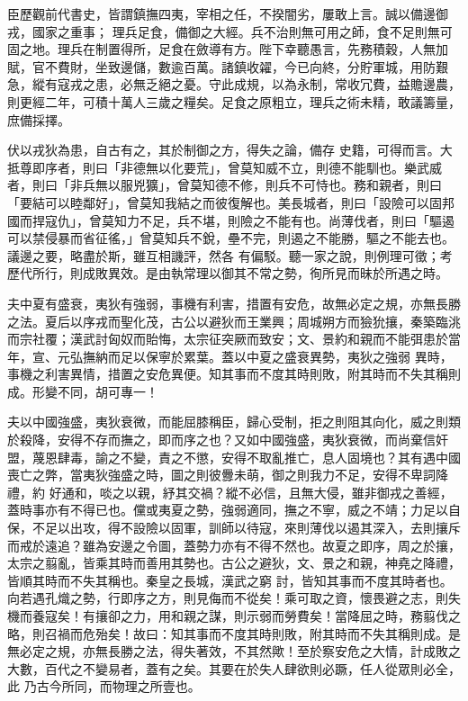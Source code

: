 \begin{pinyinscope}
 臣歷觀前代書史，皆謂鎮撫四夷，宰相之任，不揆闇劣，屢敢上言。誠以備邊御戎，國家之重事；
 理兵足食，備御之大經。兵不治則無可用之師，食不足則無可固之地。理兵在制置得所，足食在斂導有方。陛下幸聽愚言，先務積穀，人無加賦，官不費財，坐致邊儲，數逾百萬。諸鎮收糴，今已向終，分貯軍城，用防艱急，縱有寇戎之患，必無乏絕之憂。守此成規，以為永制，常收冗費，益贍邊農，則更經二年，可積十萬人三歲之糧矣。足食之原粗立，理兵之術未精，敢議籌量，庶備採擇。



 伏以戎狄為患，自古有之，其於制御之方，得失之論，備存
 史籍，可得而言。大抵尊即序者，則曰「非德無以化要荒」，曾莫知威不立，則德不能馴也。樂武威者，則曰「非兵無以服兇獷」，曾莫知德不修，則兵不可恃也。務和親者，則曰「要結可以睦鄰好」，曾莫知我結之而彼復解也。美長城者，則曰「設險可以固邦國而捍寇仇」，曾莫知力不足，兵不堪，則險之不能有也。尚薄伐者，則曰「驅遏可以禁侵暴而省征徭，」曾莫知兵不銳，壘不完，則遏之不能勝，驅之不能去也。議邊之要，略盡於斯，雖互相譏評，然各
 有偏駁。聽一家之說，則例理可徵；考歷代所行，則成敗異效。是由執常理以御其不常之勢，徇所見而昧於所遇之時。



 夫中夏有盛衰，夷狄有強弱，事機有利害，措置有安危，故無必定之規，亦無長勝之法。夏后以序戎而聖化茂，古公以避狄而王業興；周城朔方而獫狁攘，秦築臨洮而宗社覆；漢武討匈奴而貽悔，太宗征突厥而致安；文、景約和親而不能弭患於當年，宣、元弘撫納而足以保寧於累葉。蓋以中夏之盛衰異勢，夷狄之強弱
 異時，事機之利害異情，措置之安危異便。知其事而不度其時則敗，附其時而不失其稱則成。形變不同，胡可專一！



 夫以中國強盛，夷狄衰微，而能屈膝稱臣，歸心受制，拒之則阻其向化，威之則類於殺降，安得不存而撫之，即而序之也？又如中國強盛，夷狄衰微，而尚棄信奸盟，蔑恩肆毒，諭之不變，責之不懲，安得不取亂推亡，息人固境也？其有遇中國喪亡之弊，當夷狄強盛之時，圖之則彼釁未萌，御之則我力不足，安得不卑詞降禮，約
 好通和，啖之以親，紓其交禍？縱不必信，且無大侵，雖非御戎之善經，蓋時事亦有不得已也。儻或夷夏之勢，強弱適同，撫之不寧，威之不靖；力足以自保，不足以出攻，得不設險以固軍，訓師以待寇，來則薄伐以遏其深入，去則攘斥而戒於遠追？雖為安邊之令圖，蓋勢力亦有不得不然也。故夏之即序，周之於攘，太宗之翦亂，皆乘其時而善用其勢也。古公之避狄，文、景之和親，神堯之降禮，皆順其時而不失其稱也。秦皇之長城，漢武之窮
 討，皆知其事而不度其時者也。向若遇孔熾之勢，行即序之方，則見侮而不從矣！乘可取之資，懷畏避之志，則失機而養寇矣！有攘卻之力，用和親之謀，則示弱而勞費矣！當降屈之時，務翦伐之略，則召禍而危殆矣！故曰：知其事而不度其時則敗，附其時而不失其稱則成。是無必定之規，亦無長勝之法，得失著效，不其然歟！至於察安危之大情，計成敗之大數，百代之不變易者，蓋有之矣。其要在於失人肆欲則必蹶，任人從眾則必全，此
 乃古今所同，而物理之所壹也。




\end{pinyinscope}
